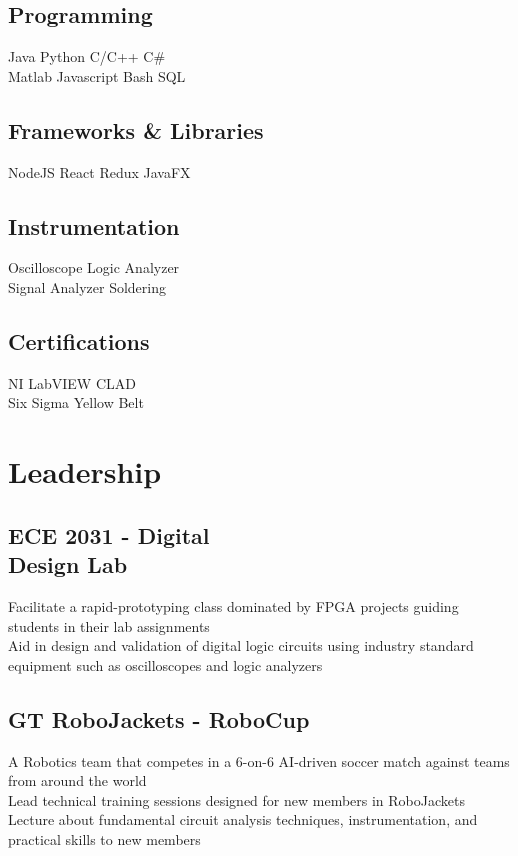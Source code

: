 \documentclass[]{deedy-resume-openfont}
\begin{document}
\begin{minipage}[t]{0.33\textwidth}
\subsection{Programming}
Java \textbullet{} Python \textbullet{} C/C++ \textbullet{} C\#\\
Matlab \textbullet{} Javascript \textbullet{}Bash \textbullet{} SQL
\sectionsep

\subsection{Frameworks \& Libraries}
NodeJS \textbullet{} React \textbullet{} Redux \textbullet{} JavaFX
\sectionsep

\subsection{Instrumentation}
Oscilloscope \textbullet{}  Logic Analyzer \textbullet{} \\  Signal Analyzer \textbullet{} Soldering
\sectionsep

\subsection{Certifications}
NI LabVIEW CLAD \textbullet{}\\ 
Six Sigma Yellow Belt

\section{Leadership}
\subsection{ECE 2031 - Digital \\ Design Lab}
\textbullet{} Facilitate a rapid-prototyping class dominated by FPGA projects guiding students in their lab assignments \\
\textbullet{} Aid in design and validation of digital logic circuits using industry standard equipment such as oscilloscopes and logic analyzers
\sectionsep

\subsection{GT RoboJackets - RoboCup}
\textbullet{} A Robotics team that competes in a 6-on-6 AI-driven soccer match against teams from around the world \\
\textbullet{} Lead technical training sessions designed for new members in RoboJackets \\
\textbullet{} Lecture about fundamental circuit analysis techniques, instrumentation, and practical skills to new members 


\end{minipage}
\end{document}
